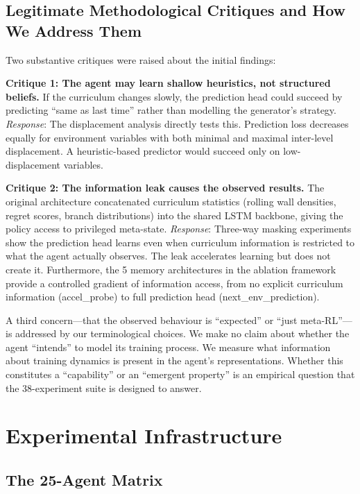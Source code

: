 \documentclass[11pt,a4paper]{article}
\theoremstyle{remark}
\begin{document}
\subsection{Legitimate Methodological Critiques and How We Address Them}

Two substantive critiques were raised about the initial findings:

\textbf{Critique 1: The agent may learn shallow heuristics, not structured beliefs.} If the curriculum changes slowly, the prediction head could succeed by predicting ``same as last time'' rather than modelling the generator's strategy. \textit{Response}: The displacement analysis directly tests this. Prediction loss decreases equally for environment variables with both minimal and maximal inter-level displacement. A heuristic-based predictor would succeed only on low-displacement variables.

\textbf{Critique 2: The information leak causes the observed results.} The original architecture concatenated curriculum statistics (rolling wall densities, regret scores, branch distributions) into the shared LSTM backbone, giving the policy access to privileged meta-state. \textit{Response}: Three-way masking experiments show the prediction head learns even when curriculum information is restricted to what the agent actually observes. The leak accelerates learning but does not create it. Furthermore, the 5 memory architectures in the ablation framework provide a controlled gradient of information access, from no explicit curriculum information (accel\_probe) to full prediction head (next\_env\_prediction).

A third concern---that the observed behaviour is ``expected'' or ``just meta-RL''---is addressed by our terminological choices. We make no claim about whether the agent ``intends'' to model its training process. We measure what information about training dynamics is present in the agent's representations. Whether this constitutes a ``capability'' or an ``emergent property'' is an empirical question that the 38-experiment suite is designed to answer.


\section{Experimental Infrastructure}

\subsection{The 25-Agent Matrix}
\end{document}
